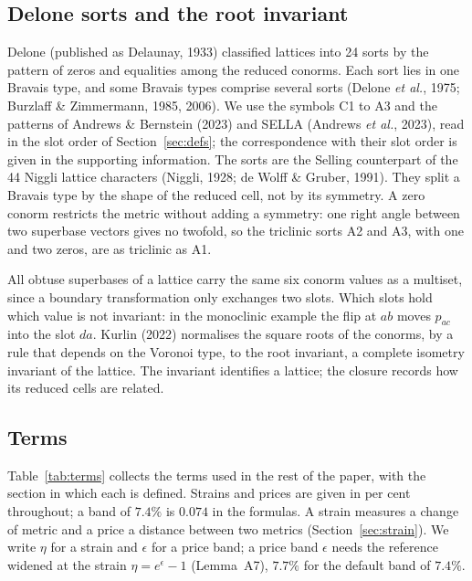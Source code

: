 \subsection{Delone sorts and the root invariant}
\label{sec:sorts}
Delone (published as Delaunay, 1933) classified lattices into 24 sorts by the pattern of zeros and equalities among the reduced conorms. Each sort lies in one Bravais type, and some Bravais types comprise several sorts (Delone \emph{et al.}, 1975; Burzlaff \& Zimmermann, 1985, 2006). We use the symbols C1 to A3 and the patterns of Andrews \& Bernstein (2023) and SELLA (Andrews \emph{et al.}, 2023), read in the slot order of Section~\ref{sec:defs}; the correspondence with their slot order is given in the supporting information. The sorts are the Selling counterpart of the 44 Niggli lattice characters (Niggli, 1928; de Wolff \& Gruber, 1991). They split a Bravais type by the shape of the reduced cell, not by its symmetry. A zero conorm restricts the metric without adding a symmetry: one right angle between two superbase vectors gives no twofold, so the triclinic sorts A2 and A3, with one and two zeros, are as triclinic as A1.

All obtuse superbases of a lattice carry the same six conorm values as a multiset, since a boundary transformation only exchanges two slots. Which slots hold which value is not invariant: in the monoclinic example the flip at $ab$ moves $p_{ac}$ into the slot $da$. Kurlin (2022) normalises the square roots of the conorms, by a rule that depends on the Voronoi type, to the root invariant, a complete isometry invariant of the lattice. The invariant identifies a lattice; the closure records how its reduced cells are related.

\subsection{Terms}
Table~\ref{tab:terms} collects the terms used in the rest of the paper, with the section in which each is defined. Strains and prices are given in per cent throughout; a band of $7.4\%$ is $0.074$ in the formulas. A strain measures a change of metric and a price a distance between two metrics (Section~\ref{sec:strain}). We write $\eta$ for a strain and $\epsilon$ for a price band; a price band $\epsilon$ needs the reference widened at the strain $\eta=e^\epsilon-1$ (Lemma~A7), $7.7\%$ for the default band of $7.4\%$.

